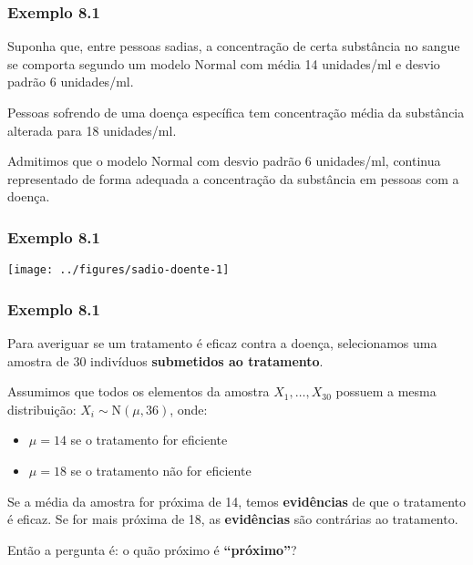 \documentclass{beamer}
\begin{document}
\begin{frame}
\frametitle{Exemplo 8.1}

Suponha que, entre pessoas sadias, a concentração de certa substância no
sangue se comporta segundo um modelo Normal com média 14 unidades/ml e
desvio padrão 6 unidades/ml.

Pessoas sofrendo de uma doença específica tem concentração média da
substância alterada para 18 unidades/ml.

Admitimos que o modelo Normal com desvio padrão 6 unidades/ml, continua
representado de forma adequada a concentração da substância em pessoas
com a doença.
\end{frame}


\begin{frame}
\frametitle{Exemplo 8.1}

\begin{center}\texttt{[image: ../figures/sadio-doente-1]} \end{center}
\end{frame}

\begin{frame}
\frametitle{Exemplo 8.1}

Para averiguar se um tratamento é eficaz contra a doença, selecionamos
uma amostra de 30 indivíduos \textbf{submetidos ao tratamento}.

Assumimos que todos os elementos da amostra \(X_1, \ldots, X_{30}\)
possuem a mesma distribuição: \(X_i \sim \text{N}(\mu, 36)\), onde:

\begin{itemize}
\item
  \(\mu = 14\) se o tratamento for eficiente
\item
  \(\mu = 18\) se o tratamento não for eficiente
\end{itemize}

Se a média da amostra for próxima de 14, temos \textbf{evidências} de
que o tratamento é eficaz. Se for mais próxima de 18, as
\textbf{evidências} são contrárias ao tratamento.

Então a pergunta é: o quão próximo é \textbf{``próximo''}?
\end{frame}
\end{document}
